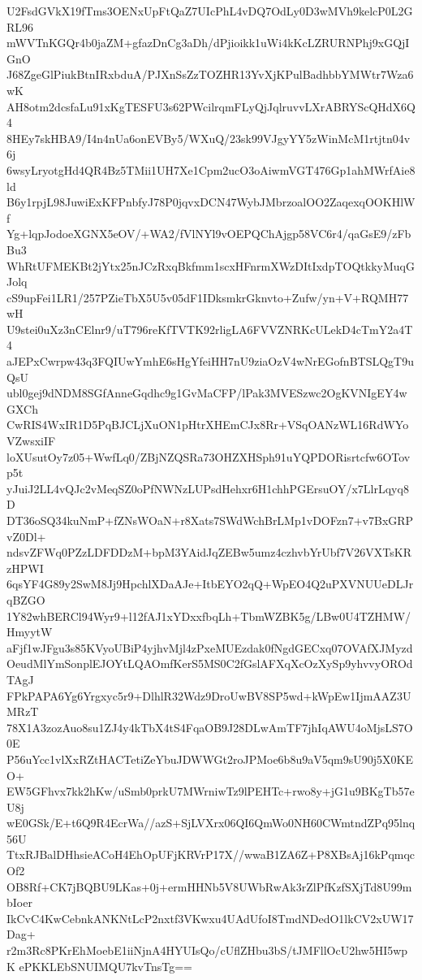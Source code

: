 U2FsdGVkX19fTms3OENxUpFtQaZ7UIcPhL4vDQ7OdLy0D3wMVh9kelcP0L2GRL96
mWVTnKGQr4b0jaZM+gfazDnCg3aDh/dPjioikk1uWi4kKcLZRURNPhj9xGQjIGnO
J68ZgeGlPiukBtnIRxbduA/PJXnSsZzTOZHR13YvXjKPulBadhbbYMWtr7Wza6wK
AH8otm2dcsfaLu91xKgTESFU3s62PWcilrqmFLyQjJqlruvvLXrABRYScQHdX6Q4
8HEy7skHBA9/I4n4nUa6onEVBy5/WXuQ/23sk99VJgyYY5zWinMcM1rtjtn04v6j
6wsyLryotgHd4QR4Bz5TMii1UH7Xe1Cpm2ucO3oAiwmVGT476Gp1ahMWrfAie8ld
B6y1rpjL98JuwiExKFPnbfyJ78P0jqvxDCN47WybJMbrzoalOO2ZaqexqOOKHlWf
Yg+lqpJodoeXGNX5eOV/+WA2/fVlNYl9vOEPQChAjgp58VC6r4/qaGsE9/zFbBu3
WhRtUFMEKBt2jYtx25nJCzRxqBkfmm1scxHFnrmXWzDItIxdpTOQtkkyMuqGJolq
cS9upFei1LR1/257PZieTbX5U5v05dF1IDksmkrGknvto+Zufw/yn+V+RQMH77wH
U9stei0uXz3nCElnr9/uT796reKfTVTK92rligLA6FVVZNRKcULekD4cTmY2a4T4
aJEPxCwrpw43q3FQIUwYmhE6sHgYfeiHH7nU9ziaOzV4wNrEGofnBTSLQgT9uQsU
ubl0gej9dNDM8SGfAnneGqdhc9g1GvMaCFP/lPak3MVESzwc2OgKVNIgEY4wGXCh
CwRIS4WxIR1D5PqBJCLjXuON1pHtrXHEmCJx8Rr+VSqOANzWL16RdWYoVZwsxiIF
loXUsutOy7z05+WwfLq0/ZBjNZQSRa73OHZXHSph91uYQPDORisrtcfw6OTovp5t
yJuiJ2LL4vQJc2vMeqSZ0oPfNWNzLUPsdHehxr6H1chhPGErsuOY/x7LlrLqyq8D
DT36oSQ34kuNmP+fZNsWOaN+r8Xats7SWdWchBrLMp1vDOFzn7+v7BxGRPvZ0Dl+
ndsvZFWq0PZzLDFDDzM+bpM3YAidJqZEBw5umz4czhvbYrUbf7V26VXTsKRzHPWI
6qsYF4G89y2SwM8Jj9HpchlXDaAJe+ItbEYO2qQ+WpEO4Q2uPXVNUUeDLJrqBZGO
1Y82whBERCl94Wyr9+l12fAJ1xYDxxfbqLh+TbmWZBK5g/LBw0U4TZHMW/HmyytW
aFjf1wJFgu3s85KVyoUBiP4yjhvMjl4zPxeMUEzdak0fNgdGECxq07OVAfXJMyzd
OeudMlYmSonplEJOYtLQAOmfKerS5MS0C2fGslAFXqXcOzXySp9yhvvyOROdTAgJ
FPkPAPA6Yg6Yrgxyc5r9+DlhlR32Wdz9DroUwBV8SP5wd+kWpEw1IjmAAZ3UMRzT
78X1A3zozAuo8su1ZJ4y4kTbX4tS4FqaOB9J28DLwAmTF7jhIqAWU4oMjsLS7O0E
P56uYcc1vlXxRZtHACTetiZeYbuJDWWGt2roJPMoe6b8u9aV5qm9sU90j5X0KEO+
EW5GFhvx7kk2hKw/uSmb0prkU7MWrniwTz9lPEHTc+rwo8y+jG1u9BKgTb57eU8j
wE0GSk/E+t6Q9R4EcrWa//azS+SjLVXrx06QI6QmWo0NH60CWmtndZPq95lnq56U
TtxRJBalDHhsieACoH4EhOpUFjKRVrP17X//wwaB1ZA6Z+P8XBsAj16kPqmqcOf2
OB8Rf+CK7jBQBU9LKas+0j+ermHHNb5V8UWbRwAk3rZlPfKzfSXjTd8U99mbIoer
IkCvC4KwCebnkANKNtLcP2nxtf3VKwxu4UAdUfoI8TmdNDedO1lkCV2xUW17Dag+
r2m3Rc8PKrEhMoebE1iiNjnA4HYUIsQo/cUflZHbu3bS/tJMFllOcU2hw5HI5wpK
ePKKLEbSNUIMQU7kvTnsTg==
